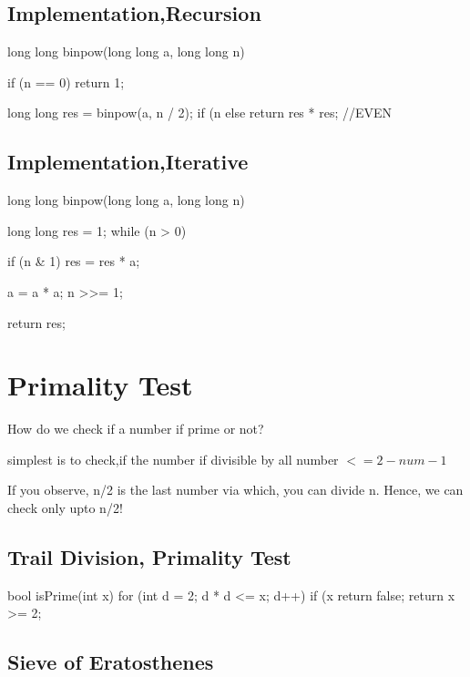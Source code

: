 \subsection{Implementation,Recursion}
\begin{code2}
    long long binpow(long long a, long long n) {
        if (n == 0) return 1;

        long long res = binpow(a, n / 2);
        if (n %
        else return res * res; //EVEN
    }
\end{code2}


\subsection{Implementation,Iterative}
\begin{code2}
    long long binpow(long long a, long long n) {
        long long res = 1;
        while (n > 0) {
            if (n & 1) res = res * a;
            
            a = a * a;
            n >>= 1;
        }
        return res;
    }
\end{code2}

\section{Primality Test}
How do we check if a number if prime or not?

\begin{compactenum}
    \item simplest is to check,if the number if divisible by all number $<= 2 - num-1$
    \item If you observe, n/2 is the last number via which, you can divide n. Hence, we can check only upto n/2!
    \item 
\end{compactenum}

\subsection{Trail Division, Primality Test}
\begin{code2}
    bool isPrime(int x) {
        for (int d = 2; d * d <= x; d++) {
            if (x %
                return false;
        }
        return x >= 2;
    }
\end{code2}

\subsection{Sieve of Eratosthenes}

